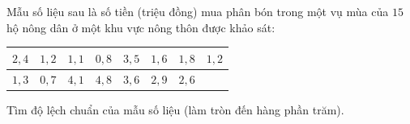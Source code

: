 \begin{ex}
Mẫu số liệu sau là số tiền (triệu đồng) mua phân bón trong một vụ mùa của $15$ hộ nông dân ở một khu vực nông thôn được khảo sát:
\begin{center}
\begin{tabular}{|c|c|c|c|c|c|c|c|}\hline
$2{,}4$ & $1{,}2$ & $1{,}1$ & $0{,}8$ & $3{,}5$ & $1{,}6$ & $1{,}8$ & $1{,}2$\\\hline
$1{,}3$ & $0{,}7$ & $4{,}1$ & $4{,}8$ & $3{,}6$ & $2{,}9$ & $2{,}6$ & \\\hline
\end{tabular}
\end{center}
Tìm độ lệch chuẩn của mẫu số liệu (làm tròn đến hàng phần trăm).
\end{ex}
